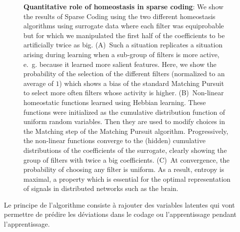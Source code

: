 \documentclass[a4paper, 11pt, draft]{article} %
\begin{document}
\begin{figure}[!ht]%
\caption{
{\bf Quantitative role of homeostasis in sparse coding}: We show the results of Sparse Coding using the two different homeostasis algorithms using surrogate data where each filter was equiprobable but for which we manipulated the first half of the coefficients to be artificially twice as big. %
{\sf (A)}~Such a situation replicates a situation arising during learning when a sub-group of filters is more active, e.~g. because it learned more salient features.  Here, we show the probability of the selection of the different filters (normalized to an average of $1$) which shows a bias of the standard Matching Pursuit to select more often filters whose activity is higher. %
{\sf (B)}~Non-linear homeostatic functions learned using Hebbian learning. These functions were initialized as the cumulative distribution function of uniform random variables. Then they are used to modify choices in the Matching step of the Matching Pursuit algorithm. Progressively, the non-linear functions converge to the (hidden) cumulative distributions of the coefficients of the surrogate, clearly showing the group of filters with twice a big coefficients. 
 {\sf (C)}~At convergence, the probability of choosing any filter is uniform. As a result, entropy is maximal, a property which is essential for the optimal representation of signals in distributed networks such as the brain.
\label{fig:HEH}}%
\end{figure}%




Le principe de l'algorithme consiste à rajouter des variables latentes
qui vont permettre de prédire les déviations dans le codage ou
l'apprentissage pendant l'apprentissage.
\end{document}
